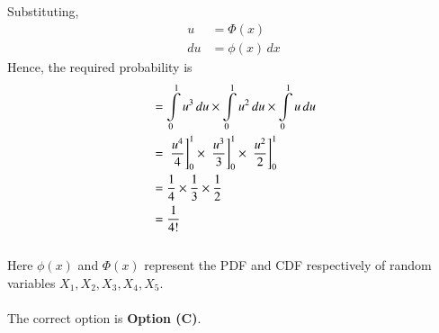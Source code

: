 \documentclass[journal,12pt,twocolumn]{IEEEtran}
\begin{document}
\hspace{1cm}Substituting,
\begin{align}
    u &= \Phi(x) \\
    du &= \phi(x) \, dx 
\end{align}
Hence, the required probability is 
\begin{align}
     &= \int\limits_0^1 u^3 \, du \times \int\limits_0^1 u^2 \, du \times \int \limits_0^1 u\,du \\
     &= {}\left.\frac{u^4}{4}\right]_0^1 \times {}\left.\frac{u^3}{3}\right]_0^1 \times {}\left.\frac{u^2}{2}\right]_0^1 \\
     &= \frac{1}{4}\times \frac{1}{3} \times \frac{1}{2} \\ 
     &= \frac{1}{4!}
\end{align}
\\Here $\phi(x)$ and $\Phi(x)$ represent the PDF and CDF respectively of random variables $X_1, X_2, X_3, X_4, X_5$.
\\
\\The correct option is \textbf{Option (C)}.
\end{document}
